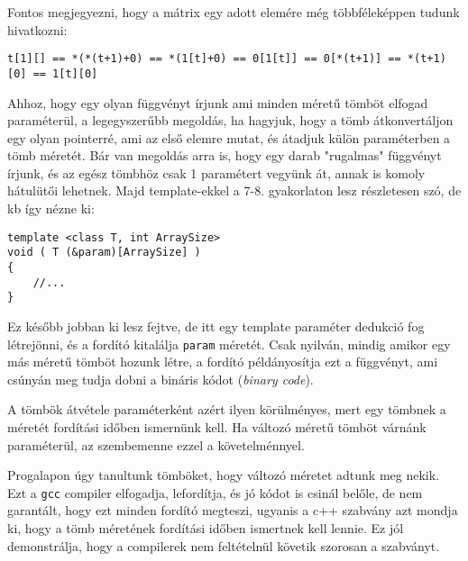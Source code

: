 \documentclass[a4paper,11.5pt,table]{article}
\begin{document}
		\medskip
		Fontos megjegyezni, hogy a mátrix egy adott elemére még többféleképpen tudunk hivatkozni:
		\medskip
		
		\begin{center}
			\texttt{t[1][] == *(*(t+1)+0) == *(1[t]+0) == 0[1[t]] == 0[*(t+1)] == *(t+1)[0] == 1[t][0] } 
		\end{center}
	\begin{note}
		Ahhoz, hogy egy olyan függvényt írjunk ami minden méretű tömböt elfogad paraméterül, a legegyszerűbb megoldás, ha hagyjuk, hogy a tömb átkonvertáljon egy olyan pointerré, ami az első elemre mutat, és átadjuk külön paraméterben a tömb méretét. Bár van megoldás arra is, hogy egy darab "rugalmas" függvényt írjunk, és az egész tömbhöz csak 1 paramétert vegyünk át, annak is komoly hátulütői lehetnek. Majd template-ekkel a 7-8. gyakorlaton lesz részletesen szó, de kb így nézne ki:
		\begin{lstlisting}
template <class T, int ArraySize>
void ( T (&param)[ArraySize] )
{
	//...
}
		\end{lstlisting}
		\smallskip
		Ez később jobban ki lesz fejtve, de itt egy template paraméter dedukció fog létrejönni, és a fordító kitalálja \texttt{param} méretét. Csak nyilván, mindig amikor egy más méretű tömböt hozunk létre, a fordító példányosítja ezt a függvényt, ami csúnyán meg tudja dobni a bináris kódot (\textit{binary code}).
		
		\smallskip
		A tömbök átvétele paraméterként azért ilyen körülményes, mert egy tömbnek a méretét fordítási időben ismernünk kell. Ha változó méretű tömböt várnánk paraméterül, az szembemenne ezzel a követelménnyel.  
	\end{note}
	\begin{note}
		Progalapon úgy tanultunk tömböket, hogy változó méretet adtunk meg nekik. Ezt a \texttt{gcc} compiler elfogadja, lefordítja, és jó kódot is csinál belőle, de nem garantált, hogy ezt minden fordító megteszi, ugyanis a c++ szabvány azt mondja ki, hogy a tömb méretének fordítási időben ismertnek kell lennie. Ez jól demonstrálja, hogy a compilerek nem feltételnül követik szorosan a szabványt.
	\end{note}
\end{document}
